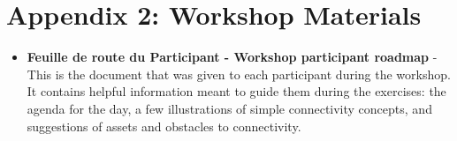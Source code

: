 
\chapter*{\textbf{Appendix 2: Workshop Materials \\ \hspace{1em}}}

\setcounter{chapter}{4}
\setcounter{table}{0}
\setcounter{figure}{0}

\begin{itemize}
  \item \textbf{Feuille de route du Participant - Workshop participant roadmap} - This is the document that was given to each participant during the workshop. It contains helpful information meant to guide them during the exercises: the agenda for the day, a few illustrations of simple connectivity concepts, and suggestions of assets and obstacles to connectivity.
\end{itemize}


% 
% 